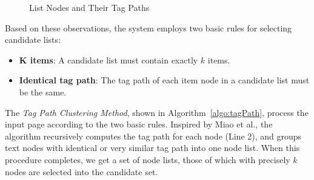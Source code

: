 \begin{figure}[th]
\centering
{}
\caption{List Nodes and Their Tag Paths}
\label{fig:tagpath}
\end{figure}



Based on these observations, the system employs two basic rules for
selecting candidate lists:
\begin{itemize}
  \item \textbf{K items}:
  A candidate list must contain exactly $k$ items.

  \item \textbf{Identical tag path}:
  The tag path of each item node in a candidate list must be the same.
\end{itemize}

The \emph{Tag Path Clustering Method}, shown in
Algorithm~\ref{algo:tagPath}, process the input page according to the
two basic rules. Inspired by Miao et al.\cite{MiaoTHSM09:TagPathClustering}, the algorithm
recursively computes the tag path for each node (Line 2), and groups
text nodes with identical or very similar tag path into one node list. 
When this procedure completes, we get a set of node lists, those of which
with precisely $k$ nodes are selected into the candidate set.

